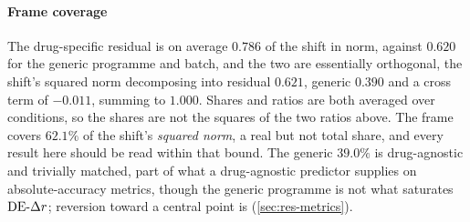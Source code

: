\paragraph{Frame coverage} The drug-specific residual is on average $0.786$ of
the shift in norm, against $0.620$ for the generic programme and batch, and the
two are essentially orthogonal, the shift's squared norm decomposing into
residual $0.621$, generic $0.390$ and a cross term of $-0.011$, summing to
$1.000$. Shares and ratios are both averaged over conditions, so the shares are
not the squares of the two ratios above. The frame covers
$62.1\%$ of the shift's \emph{squared norm}, a real but not total share, and
every result here should be read within that bound. The generic $39.0\%$ is
drug-agnostic and trivially matched, part of what a drug-agnostic predictor
supplies on absolute-accuracy metrics, though the generic programme is not what
saturates $\textrm{DE-}\Delta r$; reversion toward a central point is (\cref{sec:res-metrics}).

